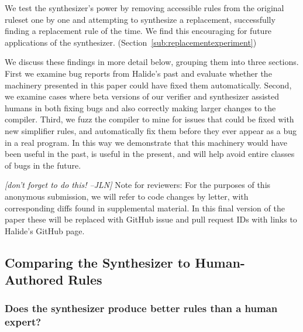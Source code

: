 \documentclass[acmsmall,review]{acmart}\settopmatter{printfolios=true,printccs=false,printacmref=false}
\newcommand{\jln}[1]{\textcolor{uwpurple}{\textit{[{#1} --JLN]}}}
\begin{document}
\begin{itemize}
  We test the synthesizer's power by removing \NumRulesInCorrectnessExperiment{} accessible rules from the original ruleset one by one and attempting to synthesize a replacement, successfully finding a replacement rule \PercentRulesResynthesized{} of the time.  We find this encouraging for future applications of the synthesizer. (Section~\ref{sub:replacementexperiment})
\end{itemize}

We discuss these findings in more detail below, grouping them into three sections. First we examine bug reports from Halide’s past and evaluate whether the machinery presented in this paper could have fixed them automatically. Second, we examine cases where beta versions of our verifier and synthesizer assisted humans in both fixing bugs and also correctly making larger changes to the compiler. Third, we fuzz the compiler to mine for issues that could be fixed with new simplifier rules, and automatically fix them before they ever appear as a bug in a real program. In this way we demonstrate that this machinery would have been useful in the past, is useful in the present, and will help avoid entire classes of bugs in the future.

\jln{don't forget to do this!}
Note for reviewers: For the purposes of this anonymous submission, we will refer to code changes by letter, with corresponding diffs found in supplemental material. In this final version of the paper these will be replaced with GitHub issue and pull request IDs with links to Halide’s GitHub page.

\subsection{Comparing the Synthesizer to Human-Authored Rules}

\subsubsection{Does the synthesizer produce better rules than a human expert?}
\label{sub:bugfixes}


\end{document}
